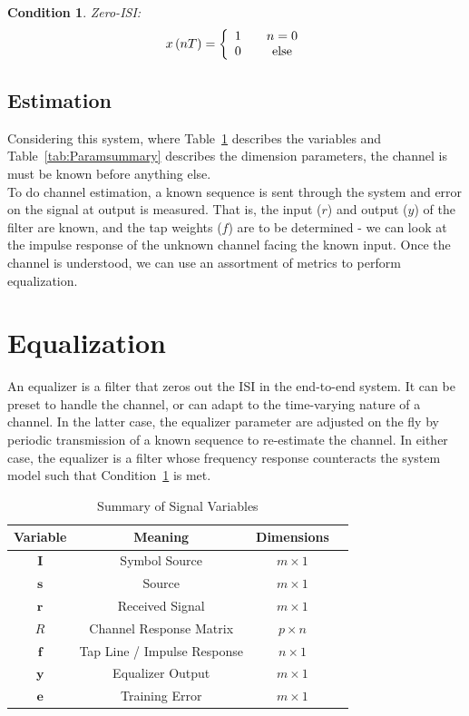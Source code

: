 \documentclass[]{article}
\newtheorem{thm}{Condition}
\begin{document}
\begin{thm}
\label{thm:zero}
Zero-ISI:
$$x\left(nT\right) = \left\{
\begin{array}{c c}
1 & \quad n=0 \\
0 & \quad \text{else}
\end{array} \right.$$
\end{thm}

\subsection{Estimation}
\label{sec:estimate}
Considering this system, where Table~\ref{tab:filtersummary} describes the variables and Table~\ref{tab:Paramsummary} describes the dimension parameters, the channel is must be known before anything else. \\

To do channel estimation, a known sequence is sent through the system and error on the signal at output is measured.  That is, the input ($r$) and output ($y$) of the filter are known, and the tap weights ($f$) are to be determined - we can look at the impulse response of the unknown channel facing the known input.  Once the channel is understood, we can use an assortment of metrics to perform equalization.

\section{Equalization}
\label{sec:equal}
An equalizer is a filter that zeros out the ISI in the end-to-end system.  It can be preset to handle the channel, or can adapt to the time-varying nature of a channel.  In the latter case, the equalizer parameter are adjusted on the fly by periodic transmission of a known sequence to re-estimate the channel.  In either case, the equalizer is a filter whose frequency response counteracts the system model such that Condition~\ref{thm:zero} is met. 

\begin{table}[H]
\begin{center}
\begin{tabular}{|c|c|c|c|}
\hline Variable & Meaning & Dimensions \\
\hline \hline
$\mathbf{I}$ & Symbol Source & $ m \times 1$ \\ \hline
$\mathbf{s}$ & Source & $m\times 1 $\\ \hline
$\mathbf{r}$ & Received Signal & $m\times 1$ \\ \hline
$R$ & Channel Response Matrix & $p\times n$ \\ \hline
$\mathbf{f}$ & Tap Line / Impulse Response & $n\times 1 $ \\ \hline
$\mathbf{y}$ & Equalizer Output & $ m\times 1 $ \\ \hline
 $\mathbf{e}$ & Training Error & $ m\times 1 $ \\ \hline
\end{tabular}
\caption{Summary of Signal Variables} \label{tab:filtersummary}
\end{center}
\end{table}
\end{document}
